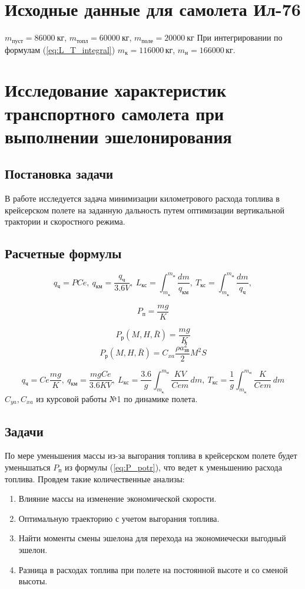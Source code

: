 \documentclass[bachelor,subf,14pt, substylefile = spbu.rtx]{disser}
\begin{document}
\section{Исходные данные для самолета Ил-76}
$m_{пуст} = 86000\ \text{кг}$, $m_{топл}= 60000\ \text{кг}$, $m_{поле}=20000\ \text{кг}$
При интегрировании по формулам (\ref{eq:L_T_integral}) $m_{к}=116000\, кг$, $m_{н}=166000\, кг$.

\section{Исследование характеристик транспортного самолета при выполнении эшелонирования}
\subsection{Постановка задачи}
В работе исследуется задача минимизации километрового расхода топлива в крейсерском полете на заданную дальность путем оптимизации вертикальной трактории и скоростного режима.  

\subsection{Расчетные формулы} 
\begin{equation}
\label{eq:L_T_integral}
q_{ч}=P Ce, \: q_{км}=\frac{q_{ч}}{3.6 V}, \: L_{кс}= \int_{m_к}^{m_н} \frac{dm}{q_{км}},\: T_{кс}= \int_{m_к}^{m_н} \frac{dm}{q_{ч}},
\end{equation}

\begin{equation}
\label{eq:P_potr}
P_п = \frac{mg}{K} 
\end{equation}

\[
P_р(M, H, \bar{R})=\frac{mg}{K} 
\]
\[
P_р(M, H, \bar{ R }) = C_{xa} \frac{\rho a_{зв}^2}{2}M^2 S   
\]

\[ 
q_ч = Ce \frac{mg}{K}, \: q_{км} = \frac{mg Ce}{3.6KV}, \: L_{кс}= \frac{3.6}{g}\int_{m_к}^{m_н} \frac{KV}{Ce m}
\, dm, \: T_{кс}= \frac{1}{g} \int_{m_к}^{m_н} \frac{K}{Ce m}\, dm
\]
$C_{ya}, C_{xa}$ из курсовой работы №1 по динамике полета.

\subsection{Задачи}
По мере уменьшения массы из-за выгорания топлива в крейсерском полете будет уменьшаться $P_п$ из формулы (\ref{eq:P_potr}), что ведет к уменьшению расхода топлива.  
Провдем такие количественные анализы:  
\begin{enumerate}
    \item Влияние массы на изменение экономической скорости.  
    \item Оптимальную траекторию с учетом выгорания топлива.
    \item Найти моменты смены эшелона для перехода на экономиечески выгодный эшелон. 
    \item Разница в расходах топлива при полете на постоянной высоте и со сменой высоты.
\end{enumerate}
\end{document}
